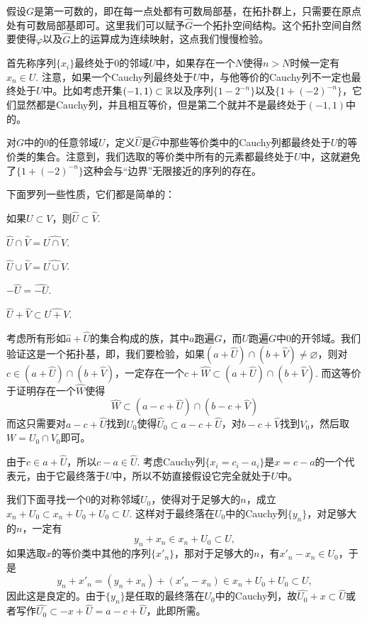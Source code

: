 \begin{para}
	假设$G$是第一可数的，即在每一点处都有可数局部基，在拓扑群上，只需要在原点处有可数局部基即可。这里我们可以赋予$\hat G$一个拓扑空间结构。这个拓扑空间自然要使得$\varphi$以及$\hat G$上的运算成为连续映射，这点我们慢慢检验。

	首先称序列$\{x_i\}$最终处于$0$的邻域$U$中，如果存在一个$N$使得$n>N$时候一定有$x_n\in U$. 注意，如果一个Cauchy列最终处于$U$中，与他等价的Cauchy列不一定也最终处于$U$中。比如考虑开集$(-1,1)\subset \mathbb{R}$以及序列$\{1-2^{-n}\}$以及$\{1+(-2)^{-n}\}$，它们显然都是Cauchy列，并且相互等价，但是第二个就并不是最终处于$(-1,1)$中的。

	对$G$中的$0$的任意邻域$U$，定义$\hat U$是$\hat G$中那些等价类中的Cauchy列都最终处于$U$的等价类的集合。注意到，我们选取的等价类中所有的元素都最终处于$U$中，这就避免了$\{1+(-2)^{-n}\}$这种会与“边界”无限接近的序列的存在。

	下面罗列一些性质，它们都是简单的：
	\begin{compactenum}
	\item 如果$U\subset V$，则$\hat U\subset \hat V$.
	\item $\hat{U}\cap \hat{V}=\widehat{U\cap V}$.

	\item $\hat{U}\cup \hat{V}=\widehat{U\cup V}$.
	\item $-\hat{U}=\widehat{-U}$.
	\item $\hat{U}+\hat{V}\subset \widehat{U+V}$.
	\end{compactenum}

	考虑所有形如$\hat{a}+\hat{U}$的集合构成的族，其中$a$跑遍$\hat G$，而$U$跑遍$G$中$0$的开邻域。我们验证这是一个拓扑基，即，我们要检验，如果$(a+\hat{U})\cap (b+\hat{V})\neq \varnothing$，则对$c\in (a+\hat{U})\cap (b+\hat{V})$，一定存在一个$c+\hat{W}\subset (a+\hat{U})\cap (b+\hat{V})$. 而这等价于证明存在一个$\hat{W}$使得
	\[
	\hat{W}\subset (a-c+\hat{U})\cap (b-c+\hat{V})
	\]
	而这只需要对$a-c+\hat{U}$找到$U_0$使得$\hat{U}_0\subset a-c+\hat{U}$，对$b-c+\hat{V}$找到$V_0$，然后取$W=U_0\cap V_0$即可。

	由于$c\in a+\hat{U}$，所以$c-a\in \hat{U}$. 考虑Cauchy列$\{x_i=c_i-a_i\}$是$x=c-a$的一个代表元，由于它最终落于$U$中，所以不妨直接假设它完全就处于$U$中。

	我们下面寻找一个$0$的对称邻域$U_0$，使得对于足够大的$n$，成立$x_n+U_0\subset x_n+U_0+U_0\subset U$. 这样对于最终落在$U_0$中的Cauchy列$\{y_n\}$，对足够大的$n$，一定有
	\[
	y_n+x_n\in x_n+U_0\subset U,
	\]
	如果选取$x$的等价类中其他的序列$\{x'_n\}$，那对于足够大的$n$，有$x'_n-x_n\in U_0$，于是
	\[
	y_n+x'_n=(y_n+x_n)+(x'_n-x_n)\in x_n+U_0+U_0\subset U,
	\]
	因此这是良定的。由于$\{y_n\}$是任取的最终落在$U_0$中的Cauchy列，故$\hat{U_0}+x\subset \hat{U}$或者写作$\hat{U_0}\subset -x+\hat{U}=a-c+\hat{U}$，此即所需。


\end{para}

